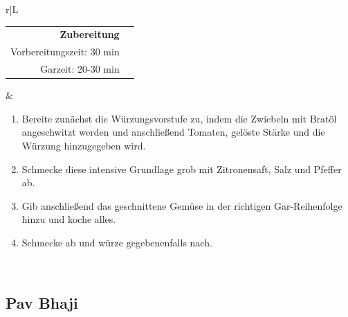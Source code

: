 \documentclass[a4paper, 12pt]{scrbook} 								%
\numberwithin{equation}{section} 									%
\begin{document}
\begin{tabularx}{\textwidth}{r|L}
				 
					\begin{tabular}[t]{rr}
						\textbf{Zubereitung}	\\
						Vorbereitungszeit: 30 min	\\
						Garzeit:	20-30 min		\\
					\end{tabular}			&	\begin{enumerate}[nosep]
													\item Bereite zunächst die Würzungsvorstufe zu, indem die Zwiebeln mit Bratöl angeschwitzt werden und anschließend Tomaten, gelöste Stärke und die Würzung hinzugegeben wird.
													\item Schmecke diese intensive Grundlage grob mit Zitronensaft, Salz und Pfeffer ab.
													\item Gib anschließend das geschnittene Gemüse in der richtigen Gar-Reihenfolge hinzu und koche alles.
													\item Schmecke ab und würze gegebenenfalls nach.
												\end{enumerate}	\\
				\end{tabularx}
				\newpage



			\subsection{Pav Bhaji}	\label{pav_bhaji}
\end{document}
